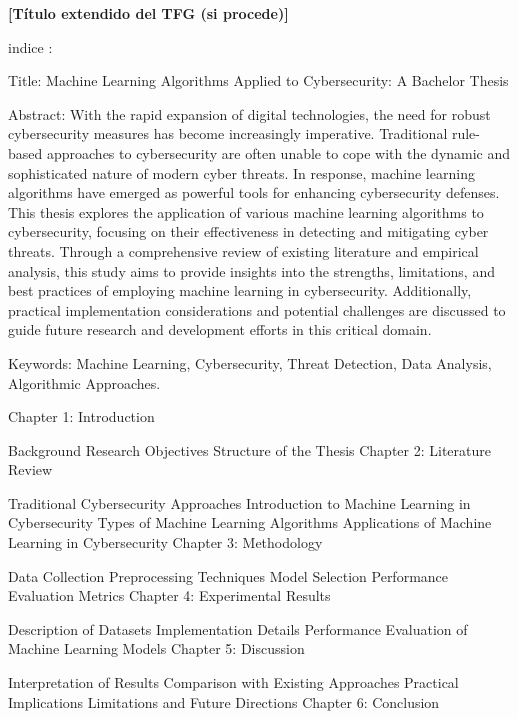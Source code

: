 \documentclass[11pt, a4paper]{article} %
\begin{document}
\newpage

{\bfseries \large [Título extendido del TFG (si procede)] }\vspace{10mm} 





\nocite{*}


indice :




Title: Machine Learning Algorithms Applied to Cybersecurity: A Bachelor Thesis

Abstract:
With the rapid expansion of digital technologies, the need for robust cybersecurity measures has become increasingly imperative. Traditional rule-based approaches to cybersecurity are often unable to cope with the dynamic and sophisticated nature of modern cyber threats. In response, machine learning algorithms have emerged as powerful tools for enhancing cybersecurity defenses. This thesis explores the application of various machine learning algorithms to cybersecurity, focusing on their effectiveness in detecting and mitigating cyber threats. Through a comprehensive review of existing literature and empirical analysis, this study aims to provide insights into the strengths, limitations, and best practices of employing machine learning in cybersecurity. Additionally, practical implementation considerations and potential challenges are discussed to guide future research and development efforts in this critical domain.

Keywords: Machine Learning, Cybersecurity, Threat Detection, Data Analysis, Algorithmic Approaches.

Chapter 1: Introduction

Background
Research Objectives
Structure of the Thesis
Chapter 2: Literature Review

Traditional Cybersecurity Approaches
Introduction to Machine Learning in Cybersecurity
Types of Machine Learning Algorithms
Applications of Machine Learning in Cybersecurity
Chapter 3: Methodology

Data Collection
Preprocessing Techniques
Model Selection
Performance Evaluation Metrics
Chapter 4: Experimental Results

Description of Datasets
Implementation Details
Performance Evaluation of Machine Learning Models
Chapter 5: Discussion

Interpretation of Results
Comparison with Existing Approaches
Practical Implications
Limitations and Future Directions
Chapter 6: Conclusion
\end{document}
